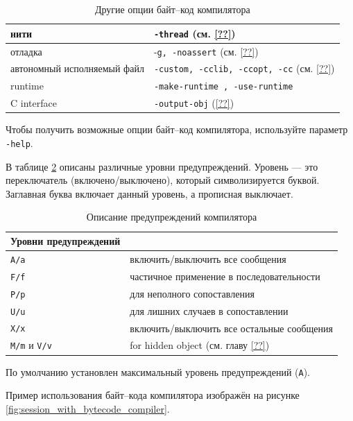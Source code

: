 \begin{table}[hc]
	\centering
	\caption{\label{tbl:other_options_for_the_bytecode_compiler}Другие опции
байт--код компилятора}
	\begin{tabular}{|l|l|}
	\hline
	нити & \texttt{-thread} (см. \ref{??}) \\
	\hline
	отладка & -\texttt{g, -noassert} (см. \ref{??}) \\
	\hline
	автономный исполняемый файл & \texttt{-custom, -cclib, -ccopt, -cc} (см.
\ref{??}) \\
	\hline
	runtime & \texttt{-make-runtime , -use-runtime} \\
	\hline
	C interface & \texttt{-output-obj} (\ref{??}) \\
	\hline
	\end{tabular}
\end{table}

Чтобы получить возможные опции байт--код компилятора, используйте параметр
\texttt{-help}.

В таблице \ref{tbl:description_of_compilation_warnings} описаны различные уровни
предупреждений. Уровень --- это переключатель (включено/выключено), который
символизируется буквой. Заглавная буква включает данный уровень, а прописная
выключает.

\begin{table}[hc]
	\centering
	\caption{\label{tbl:description_of_compilation_warnings}Описание
предупреждений компилятора}
	\begin{tabular}{|l|l|}
	\hline
	Уровни предупреждений & \\
	\hline
	\texttt{A/a} & включить/выключить все сообщения \\
	\hline
	\texttt{F/f} & частичное применение в последовательности \\
	\hline
	\texttt{P/p} & для неполного сопоставления \\
	\hline
	\texttt{U/u} & для лишних случаев в сопоставлении \\
	\hline
	\texttt{X/x} & включить/выключить все остальные сообщения \\
	\hline
	\texttt{M/m} и \texttt{V/v} & for hidden object (см. главу \ref{??}) \\
	\hline
	\end{tabular}
\end{table}

По умолчанию установлен максимальный уровень предупреждений (\texttt{A}).

Пример использования байт--кода компилятора изображён на рисунке
\ref{fig:session_with_bytecode_compiler}.

